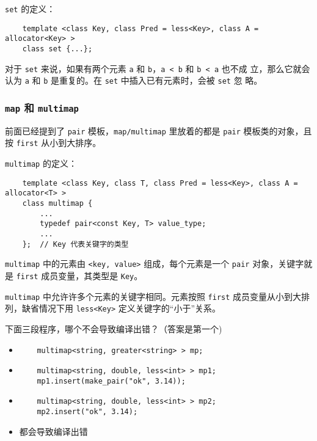 \documentclass[UTF8]{ctexart}
\begin{document}
\texttt{set} 的定义：
\begin{verbatim}
    template <class Key, class Pred = less<Key>, class A = allocator<Key> >
    class set {...};
\end{verbatim}

对于 \texttt{set} 来说，如果有两个元素 \texttt{a} 和 \texttt{b}，\texttt{a < b} 和 \texttt{b < a} 也不成
立，那么它就会认为 \texttt{a} 和 \texttt{b} 是重复的。在 \texttt{set} 中插入已有元素时，会被 \texttt{set} 忽
略。

\subsubsection{\texttt{map} 和 \texttt{multimap}}
前面已经提到了 \texttt{pair} 模板，\texttt{map/multimap} 里放着的都是 \texttt{pair} 模板类的对象，且按
\texttt{first} 从小到大排序。

\texttt{multimap} 的定义：
\begin{verbatim}
    template <class Key, class T, class Pred = less<Key>, class A = allocator<T> >
    class multimap {
        ...
        typedef pair<const Key, T> value_type;
        ...
    };  // Key 代表关键字的类型
\end{verbatim}
\texttt{multimap} 中的元素由 \texttt{<key, value>} 组成，每个元素是一个 \texttt{pair} 对象，关键字就是
\texttt{first} 成员变量，其类型是 \texttt{Key}。

\texttt{multimap} 中允许许多个元素的关键字相同。元素按照 \texttt{first} 成员变量从小到大排列，缺省情况下用
\texttt{less<Key>} 定义关键字的“小于”关系。

下面三段程序，哪个不会导致编译出错？（答案是第一个)
\begin{itemize}
    \item
    \begin{verbatim}
    multimap<string, greater<string> > mp;
    \end{verbatim}
    \item
    \begin{verbatim}
    multimap<string, double, less<int> > mp1;
    mp1.insert(make_pair("ok", 3.14));
    \end{verbatim}
    \item
    \begin{verbatim}
    multimap<string, double, less<int> > mp2;
    mp2.insert("ok", 3.14);
    \end{verbatim}
    \item 都会导致编译出错
\end{itemize}
\end{document}
